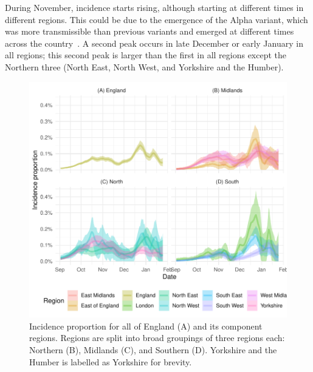 \documentclass[thesis.tex]{subfiles}
\begin{document}
During November, incidence starts rising, although starting at different times in different regions.
This could be due to the emergence of the Alpha variant, which was more transmissible than previous variants and emerged at different times across the country~\autocites{walkerTracking}{daviesEstimated}{lythgoeLineage}.
A second peak occurs in late December or early January in all regions; this second peak is larger than the first in all regions except the Northern three (North East, North West, and Yorkshire and the Humber).
\begin{figure}
    \includegraphics{transmission/backcalc-regions}
    \caption[Incidence estimated using backcalculation by region]{%
        Incidence proportion for all of England (A) and its component regions.
        Regions are split into broad groupings of three regions each: Northern (B), Midlands (C), and Southern (D).
        Yorkshire and the Humber is labelled as Yorkshire for brevity.
    }
    \label{transmission:fig:backcalc-regions}
\end{figure}
\end{document}
